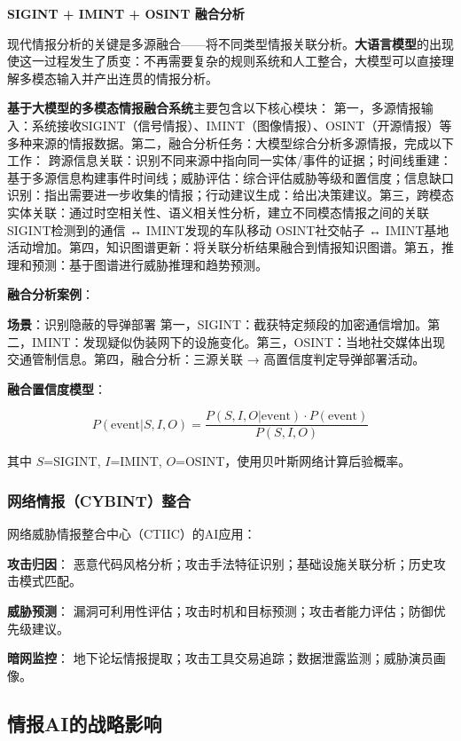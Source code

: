 \textbf{SIGINT + IMINT + OSINT 融合分析}

现代情报分析的关键是多源融合——将不同类型情报关联分析。\textbf{大语言模型}的出现使这一过程发生了质变：不再需要复杂的规则系统和人工整合，大模型可以直接理解多模态输入并产出连贯的情报分析。

\textbf{基于大模型的多模态情报融合系统}主要包含以下核心模块：
第一，多源情报输入：系统接收SIGINT（信号情报）、IMINT（图像情报）、OSINT（开源情报）等多种来源的情报数据。第二，融合分析任务：大模型综合分析多源情报，完成以下工作： 跨源信息关联：识别不同来源中指向同一实体/事件的证据；时间线重建：基于多源信息构建事件时间线；威胁评估：综合评估威胁等级和置信度；信息缺口识别：指出需要进一步收集的情报；行动建议生成：给出决策建议。第三，跨模态实体关联：通过时空相关性、语义相关性分析，建立不同模态情报之间的关联 SIGINT检测到的通信 ↔ IMINT发现的车队移动 OSINT社交帖子 ↔ IMINT基地活动增加。第四，知识图谱更新：将关联分析结果融合到情报知识图谱。第五，推理和预测：基于图谱进行威胁推理和趋势预测。

\textbf{融合分析案例}：

\textbf{场景}：识别隐蔽的导弹部署
第一，SIGINT：截获特定频段的加密通信增加。第二，IMINT：发现疑似伪装网下的设施变化。第三，OSINT：当地社交媒体出现交通管制信息。第四，融合分析：三源关联 → 高置信度判定导弹部署活动。

\textbf{融合置信度模型}：

$$P(\text{event}|S,I,O) = \frac{P(S,I,O|\text{event}) \cdot P(\text{event})}{P(S,I,O)}$$

其中 $S$=SIGINT, $I$=IMINT, $O$=OSINT，使用贝叶斯网络计算后验概率。


\subsubsection{网络情报（CYBINT）整合}

网络威胁情报整合中心（CTIIC）的AI应用：

\textbf{攻击归因}：
恶意代码风格分析；攻击手法特征识别；基础设施关联分析；历史攻击模式匹配。

\textbf{威胁预测}：
漏洞可利用性评估；攻击时机和目标预测；攻击者能力评估；防御优先级建议。

\textbf{暗网监控}：
地下论坛情报提取；攻击工具交易追踪；数据泄露监测；威胁演员画像。

\subsection{情报AI的战略影响}

